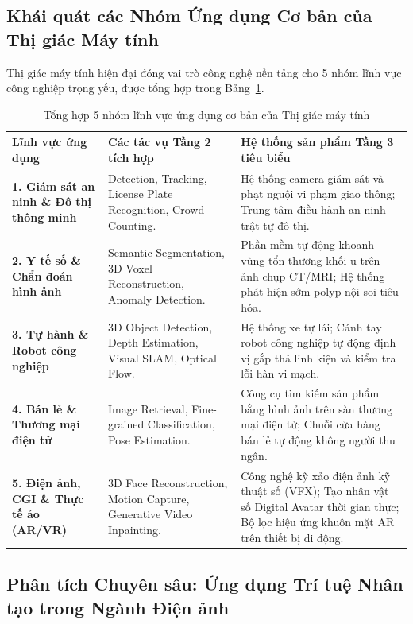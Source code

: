 \subsection{Khái quát các Nhóm Ứng dụng Cơ bản của Thị giác Máy tính}

Thị giác máy tính hiện đại đóng vai trò công nghệ nền tảng cho 5 nhóm lĩnh vực công nghiệp trọng yếu, được tổng hợp trong Bảng~\ref{tab:cv_application_domains}.

\begin{table}[H]
\centering
\small
\caption{Tổng hợp 5 nhóm lĩnh vực ứng dụng cơ bản của Thị giác máy tính}
\label{tab:cv_application_domains}
\renewcommand{\arraystretch}{1.3}
\begin{tabularx}{\textwidth}{|p{3.2cm}|X|X|}
\hline
\textbf{Lĩnh vực ứng dụng} & \textbf{Các tác vụ Tầng 2 tích hợp} & \textbf{Hệ thống sản phẩm Tầng 3 tiêu biểu} \\
\hline
\textbf{1. Giám sát an ninh \& Đô thị thông minh} & Detection, Tracking, License Plate Recognition, Crowd Counting. & Hệ thống camera giám sát và phạt nguội vi phạm giao thông; Trung tâm điều hành an ninh trật tự đô thị. \\
\hline
\textbf{2. Y tế số \& Chẩn đoán hình ảnh} & Semantic Segmentation, 3D Voxel Reconstruction, Anomaly Detection. & Phần mềm tự động khoanh vùng tổn thương khối u trên ảnh chụp CT/MRI; Hệ thống phát hiện sớm polyp nội soi tiêu hóa. \\
\hline
\textbf{3. Tự hành \& Robot công nghiệp} & 3D Object Detection, Depth Estimation, Visual SLAM, Optical Flow. & Hệ thống xe tự lái; Cánh tay robot công nghiệp tự động định vị gắp thả linh kiện và kiểm tra lỗi hàn vi mạch. \\
\hline
\textbf{4. Bán lẻ \& Thương mại điện tử} & Image Retrieval, Fine-grained Classification, Pose Estimation. & Công cụ tìm kiếm sản phẩm bằng hình ảnh trên sàn thương mại điện tử; Chuỗi cửa hàng bán lẻ tự động không người thu ngân. \\
\hline
\textbf{5. Điện ảnh, CGI \& Thực tế ảo (AR/VR)} & 3D Face Reconstruction, Motion Capture, Generative Video Inpainting. & Công nghệ kỹ xảo điện ảnh kỹ thuật số (VFX); Tạo nhân vật số Digital Avatar thời gian thực; Bộ lọc hiệu ứng khuôn mặt AR trên thiết bị di động. \\
\hline
\end{tabularx}
\end{table}

\subsection{Phân tích Chuyên sâu: Ứng dụng Trí tuệ Nhân tạo trong Ngành Điện ảnh}

